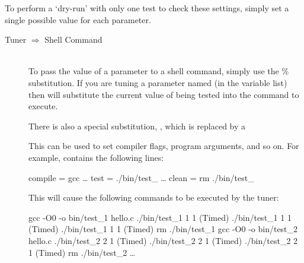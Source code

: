 \documentclass[a4paper, draft]{article}
\begin{document}
To perform a `dry-run' with only one test to check these settings, 
simply set a single possible value for each parameter.

\begin{description}

\item[Tuner $\Longrightarrow$ Shell Command] \hfill\\
    To pass the value of a parameter to a shell command, simply use the \% 
    substitution. If you are tuning a parameter named  (in the 
    variable list) then  will substitute the current 
    value of  being tested into the command to execute.
    
    There is also a special substitution, , which is 
    replaced by a 
    
    This can be used to set compiler flags, program arguments, and so on. For 
    example,  contains the following lines:
    {
    \let\theFancyVerbLineOld\theFancyVerbLine
    \renewcommand{\theFancyVerbLine}{%
        \ifthenelse{\value{FancyVerbLine} = 1}{%
            \setcounter{FancyVerbLine}{49} %
            \theFancyVerbLineOld %
        }{}%
        \ifthenelse{\value{FancyVerbLine} = 51}{%
            \setcounter{FancyVerbLine}{56} %
            \theFancyVerbLineOld %
        }{}%
        \ifthenelse{\value{FancyVerbLine} = 58}{%
            \setcounter{FancyVerbLine}{66} %
            \theFancyVerbLineOld %
        }{}%
    }
    \begin{Code}[label=\codelabel{examples/hello/hello.conf},
                    commandchars=\\\{\}]
compile = gcc %
\ldots{}
test = ./bin/test_%
\ldots{}
clean = rm ./bin/test_%
    \end{Code}
    }
    
    This will cause the following commands to be executed by the tuner:
    \begin{Code}[numbers=none, commandchars=\\\{\}]
gcc -O0 -o bin/test_1 hello.c
./bin/test_1 1 1                                                  (Timed)
./bin/test_1 1 1                                                  (Timed)
./bin/test_1 1 1                                                  (Timed)
rm ./bin/test_1
gcc -O0 -o bin/test_2 hello.c
./bin/test_2 2 1                                                  (Timed)
./bin/test_2 2 1                                                  (Timed)
./bin/test_2 2 1                                                  (Timed)
rm ./bin/test_2
\ldots{}
    \end{Code}
    

\end{description}
\end{document}
